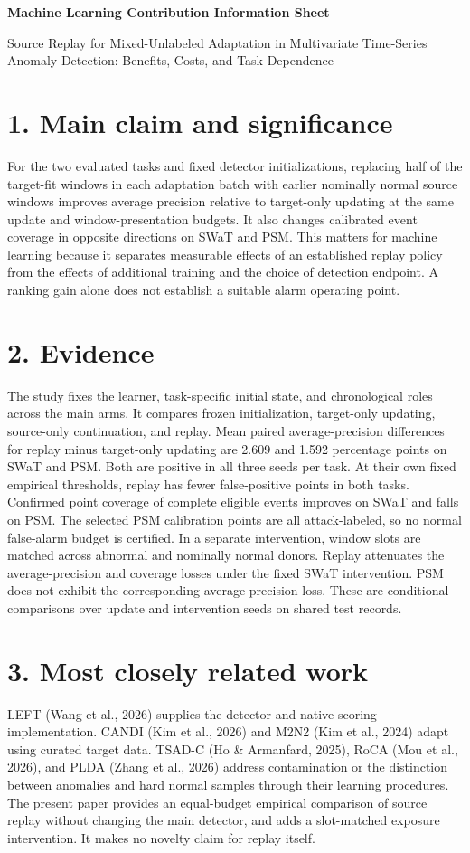 \documentclass[11pt]{article}
\begin{document}
\begin{center}
{\large\bfseries Machine Learning Contribution Information Sheet}\par
\vspace{0.7em}
Source Replay for Mixed-Unlabeled Adaptation in Multivariate Time-Series
Anomaly Detection: Benefits, Costs, and Task Dependence
\end{center}

\section*{1. Main claim and significance}
For the two evaluated tasks and fixed detector initializations, replacing half of the target-fit windows in each adaptation batch with earlier nominally normal source windows improves average precision relative to target-only updating at the same update and window-presentation budgets. It also changes calibrated event coverage in opposite directions on SWaT and PSM. This matters for machine learning because it separates measurable effects of an established replay policy from the effects of additional training and the choice of detection endpoint. A ranking gain alone does not establish a suitable alarm operating point.

\section*{2. Evidence}
The study fixes the learner, task-specific initial state, and chronological roles across the main arms. It compares frozen initialization, target-only updating, source-only continuation, and replay. Mean paired average-precision differences for replay minus target-only updating are 2.609 and 1.592 percentage points on SWaT and PSM. Both are positive in all three seeds per task. At their own fixed empirical thresholds, replay has fewer false-positive points in both tasks. Confirmed point coverage of complete eligible events improves on SWaT and falls on PSM. The selected PSM calibration points are all attack-labeled, so no normal false-alarm budget is certified. In a separate intervention, window slots are matched across abnormal and nominally normal donors. Replay attenuates the average-precision and coverage losses under the fixed SWaT intervention. PSM does not exhibit the corresponding average-precision loss. These are conditional comparisons over update and intervention seeds on shared test records.

\section*{3. Most closely related work}
LEFT (Wang et al., 2026) supplies the detector and native scoring implementation. CANDI (Kim et al., 2026) and M2N2 (Kim et al., 2024) adapt using curated target data. TSAD-C (Ho \& Armanfard, 2025), RoCA (Mou et al., 2026), and PLDA (Zhang et al., 2026) address contamination or the distinction between anomalies and hard normal samples through their learning procedures. The present paper provides an equal-budget empirical comparison of source replay without changing the main detector, and adds a slot-matched exposure intervention. It makes no novelty claim for replay itself.
\end{document}
